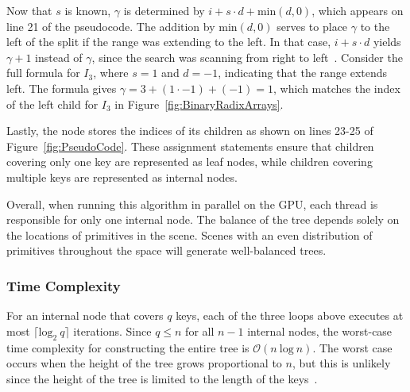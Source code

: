 \documentclass{sig-alternate}
\newcommand{\ceil}[1]{\lceil #1 \rceil}
\begin{document}

Now that $s$ is known, $\gamma$ is determined by $i + s \cdot d + \textrm{min}(d, 0)$, which appears on line 21 of the pseudocode. The addition by $\textrm{min}(d, 0)$ serves to place $\gamma$ to the left of the split if the range was extending to the left. In that case, $i + s \cdot d$ yields $\gamma + 1$ instead of $\gamma$, since the search was scanning from right to left~\cite{Karras:2012}. Consider the full formula for $I_3$, where $s=1$ and $d=-1$, indicating that the range extends left. The formula gives $\gamma=3+(1 \cdot -1) + (-1)=1$, which matches the index of the left child for $I_3$ in Figure~\ref{fig:BinaryRadixArrays}.

Lastly, the node stores the indices of its children as shown on lines 23-25 of Figure~\ref{fig:PseudoCode}. These assignment statements ensure that children covering only one key are represented as leaf nodes, while children covering multiple keys are represented as internal nodes.

Overall, when running this algorithm in parallel on the GPU, each thread is responsible for only one internal node. The balance of the tree depends solely on the locations of primitives in the scene. Scenes with an even distribution of primitives throughout the space will generate well-balanced trees.

\subsubsection{Time Complexity}
\label{sec:time}

For an internal node that covers $q$ keys, each of the three loops above executes at most $\ceil{\textrm{log}_{2}~q}$ iterations. Since $q \leq n$ for all $n-1$ internal nodes, the worst-case time complexity for constructing the entire tree is $\mathcal{O}(n~\textrm{log}~n)$. The worst case occurs when the height of the tree grows proportional to $n$, but this is unlikely since the height of the tree is limited to the length of the keys~\cite{Karras:2012}.
\end{document}
